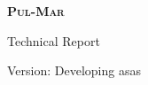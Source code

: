  \begin{titlepage}
   \centering
   {\scshape\Huge \textbf{Pul-Mar}}\par\vspace{0.3cm}
   Technical Report\par\vspace{0.5cm}
   \begin{tcolorbox}[colback=red!5!white,colframe=red!75!black]
     Version: Developing \hfill asas
   \end{tcolorbox}
 \end{titlepage}
 

